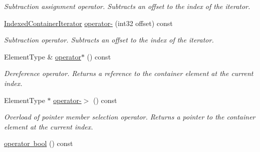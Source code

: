 \begin{DoxyCompactItemize}
\begin{DoxyCompactList}\small\item\em Subtraction assignment operator. Subtracts an offset to the index of the iterator. \end{DoxyCompactList}\item 
\mbox{\label{class_arcana_1_1_indexed_container_iterator_a4245cbd35b75c07a98da57b7fc534268}} 
\mbox{\hyperlink{class_arcana_1_1_indexed_container_iterator}{Indexed\+Container\+Iterator}} \mbox{\hyperlink{class_arcana_1_1_indexed_container_iterator_a4245cbd35b75c07a98da57b7fc534268}{operator-\/}} (int32 offset) const
\begin{DoxyCompactList}\small\item\em Subtraction operator. Subtracts an offset to the index of the iterator. \end{DoxyCompactList}\item 
\mbox{\label{class_arcana_1_1_indexed_container_iterator_aeef395899950a68702ef3c198e93faa3}} 
Element\+Type \& \mbox{\hyperlink{class_arcana_1_1_indexed_container_iterator_aeef395899950a68702ef3c198e93faa3}{operator$\ast$}} () const
\begin{DoxyCompactList}\small\item\em Dereference operator. Returns a reference to the container element at the current index. \end{DoxyCompactList}\item 
\mbox{\label{class_arcana_1_1_indexed_container_iterator_ac389ea0b34f03ca8ada424b31cfc8729}} 
Element\+Type $\ast$ \mbox{\hyperlink{class_arcana_1_1_indexed_container_iterator_ac389ea0b34f03ca8ada424b31cfc8729}{operator-\/$>$}} () const
\begin{DoxyCompactList}\small\item\em Overload of pointer member selection operator. Returns a pointer to the container element at the current index. \end{DoxyCompactList}\item 
\mbox{\label{class_arcana_1_1_indexed_container_iterator_a1d82d3b238967897232940197d20f9e0}} 
\mbox{\hyperlink{class_arcana_1_1_indexed_container_iterator_a1d82d3b238967897232940197d20f9e0}{operator bool}} () const

\end{DoxyCompactItemize}
